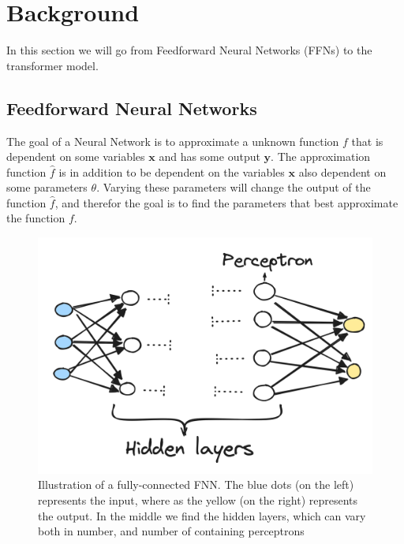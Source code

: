 \section{Background}
In this section we will go from Feedforward Neural Networks (FFNs) to the transformer model.


\subsection{Feedforward Neural Networks}
The goal of a Neural Network is to approximate a unknown function $f$ that is
dependent on some variables $\textbf{x}$ and has some output $\textbf{y}$. The 
approximation function $\hat{f}$ is in addition to be dependent on the variables
$\textbf{x}$ also dependent on some parameters $\theta$. Varying these parameters
will change the output of the function $\hat{f}$, and therefor the goal is to find the
parameters that best approximate the function $f$. 


\begin{figure}[h!]
    \centering %
    \includegraphics[scale=0.25]{../figs/FNN.pdf} %
    \caption{Illustration of a fully-connected FNN. The blue dots (on the left) represents the input, where as the yellow 
    (on the right) represents the output. In the middle we find the hidden layers, which can vary both in number, and number of containing perceptrons} %
    \label{fig:FNN}
\end{figure}


